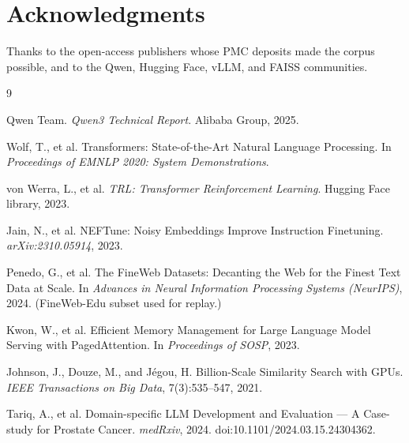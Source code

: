 \documentclass[11pt]{article}
\begin{document}
\section*{Acknowledgments}

Thanks to the open-access publishers whose PMC deposits made the corpus
possible, and to the Qwen, Hugging Face, vLLM, and FAISS communities.

\begin{thebibliography}{9}

Qwen Team.
\newblock \emph{Qwen3 Technical Report}.
\newblock Alibaba Group, 2025.

Wolf, T., et al.
\newblock Transformers: State-of-the-Art Natural Language Processing.
\newblock In \emph{Proceedings of EMNLP 2020: System Demonstrations}.

von Werra, L., et al.
\newblock \emph{TRL: Transformer Reinforcement Learning}.
\newblock Hugging Face library, 2023.

Jain, N., et al.
\newblock NEFTune: Noisy Embeddings Improve Instruction Finetuning.
\newblock \emph{arXiv:2310.05914}, 2023.

Penedo, G., et al.
\newblock The FineWeb Datasets: Decanting the Web for the Finest Text Data
at Scale.
\newblock In \emph{Advances in Neural Information Processing Systems
(NeurIPS)}, 2024.
\newblock (FineWeb-Edu subset used for replay.)

Kwon, W., et al.
\newblock Efficient Memory Management for Large Language Model Serving
with PagedAttention.
\newblock In \emph{Proceedings of SOSP}, 2023.

Johnson, J., Douze, M., and J\'egou, H.
\newblock Billion-Scale Similarity Search with GPUs.
\newblock \emph{IEEE Transactions on Big Data}, 7(3):535--547, 2021.

Tariq, A., et al.
\newblock Domain-specific LLM Development and Evaluation --- A
Case-study for Prostate Cancer.
\newblock \emph{medRxiv}, 2024.
\newblock doi:10.1101/2024.03.15.24304362.

\end{thebibliography}
\end{document}
